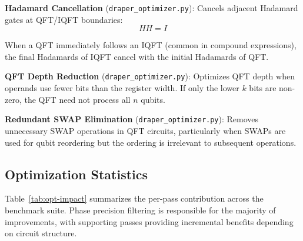 \documentclass[a4paper,twocolumn]{article}
\begin{document}
\textbf{Hadamard Cancellation} (\texttt{draper\_optimizer.py}): Cancels adjacent Hadamard gates at QFT/IQFT boundaries:
\begin{equation}
  H H = I
\end{equation}

When a QFT immediately follows an IQFT (common in compound expressions), the final Hadamards of IQFT cancel with the initial Hadamards of QFT.

\textbf{QFT Depth Reduction} (\texttt{draper\_optimizer.py}): Optimizes QFT depth when operands use
fewer bits than the register width. If only the lower $k$ bits are non-zero, the QFT need not process all $n$ qubits.

\textbf{Redundant SWAP Elimination} (\texttt{draper\_optimizer.py}): Removes unnecessary SWAP operations in QFT circuits,
particularly when SWAPs are used for qubit reordering but the ordering is irrelevant to subsequent operations.

\subsection{Optimization Statistics}

Table~\ref{tab:opt-impact} summarizes the per-pass contribution across the benchmark suite. Phase precision
filtering is responsible for the majority of improvements, with supporting passes providing incremental
benefits depending on circuit structure.

\begin{table}[htbp]
  \centering
  \caption{Optimization Pass Impact}
  \label{tab:opt-impact}
\end{table}
\end{document}
